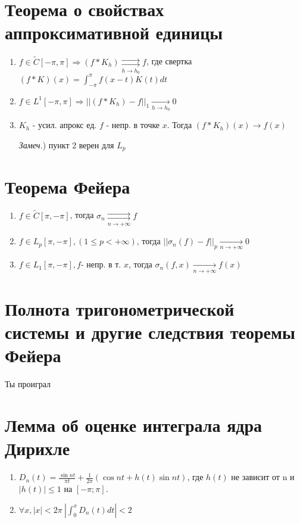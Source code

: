 \documentclass[paper=a4, fontsize=14pt]{report}
\begin{document}
    \section{Теорема о свойствах аппроксимативной единицы}
    \begin{enumerate}
        \item $f \in \widetilde{C}[-\pi, \pi] \Rightarrow (f * K_h) \underset{h \rightarrow h_0}{\rightrightarrows} f $, где
        свертка $(f* K)(x) = \int_{-\pi}^{\pi} f(x-t)K(t)dt$
        
        \item $f \in L^1 [-\pi, \pi] \Rightarrow ||(f * K_h) - f||_1 \underset{h \rightarrow h_0}{\rightarrow} 0 $
        \item $K_h$ - усил. апрокс ед. $f$ - непр. в точке $x$. Тогда $(f * K_h)(x) \rightarrow f(x)$

        \emph{Замеч.}) пункт 2 верен для $ L_p $
    \end{enumerate}

    \section{Теорема Фейера}
        \begin{enumerate}
            \item $ f \in \widetilde{C}[\pi, -\pi] $, тогда $ \sigma_n \underset{n \rightarrow +\infty}{\rightrightarrows} f$

            \item $ f \in L_p[\pi, -\pi], (1 \leq p < +\infty)$, тогда $ ||\sigma_n(f) - f||_p \underset{n \rightarrow +\infty}{\rightarrow} 0 $

            \item $ f \in L_1[\pi, -\pi], f $- непр. в т. $x$, тогда $ \sigma_n(f, x) \underset{n \rightarrow +\infty}{\rightarrow} f(x) $
        \end{enumerate}

    \section{Полнота тригонометрической системы и другие следствия теоремы Фейера}
    Ты проиграл

    \section{Лемма об оценке интеграла ядра Дирихле}
    \begin{enumerate}
        \item $D_n(t) = \frac{\sin nt}{\pi t} + \frac{1}{2\pi}(\cos nt + h(t)\sin nt)$, где $h(t)$ не зависит от n и $|h(t)| \leq 1$
            на $[-\pi;\pi]$.
        \item $\forall x, |x| < 2\pi\ |\int_0^x D_n(t) dt| < 2$
    \end{enumerate}
\end{document}
